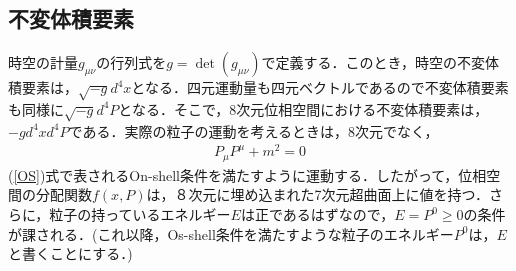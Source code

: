 \subsection{不変体積要素}
時空の計量$g_{\mu\nu}$の行列式を$g=\det(g_{\mu\nu})$で定義する．このとき，時空の不変体積要素は，$\sqrt{-g}d^4x$となる．四元運動量も四元ベクトルであるので不変体積要素も同様に$\sqrt{-g}d^4P$となる．そこで，8次元位相空間における不変体積要素は，$-gd^4xd^4P$である．実際の粒子の運動を考えるときは，8次元でなく，
\begin{eqnarray}
\label{Os}
P_{\mu}P^{\mu}+m^2=0
\end{eqnarray}
(\ref{OS})式で表されるOn-shell条件を満たすように運動する．したがって，位相空間の分配関数$f(x,P)$は，８次元に埋め込まれた7次元超曲面上に値を持つ．さらに，粒子の持っているエネルギー$E$は正であるはずなので，$E=P^{0}\geqslant0$の条件が課される．(これ以降，Os-shell条件を満たすような粒子のエネルギー$P^0$は，$E$と書くことにする．)

